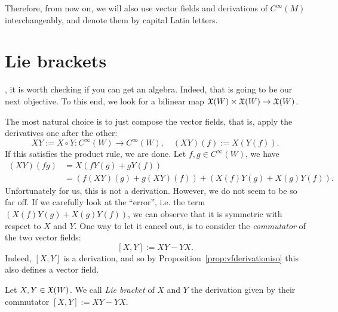 \begin{tcolorbox}
Therefore, from now on, we will also use vector fields and derivations of $C^\infty(M)$ interchangeably, and denote them by capital Latin letters.
\end{tcolorbox}

\section{Lie brackets}

, it is worth checking if you can get an algebra.
Indeed, that is going to be our next objective.
To this end, we look for a bilinear map $\mathfrak{X}(W)\times\mathfrak{X}(W) \to \mathfrak{X}(W)$.

The most natural choice is to just compose the vector fields, that is, apply the derivatives one after the other:
\begin{equation}
	X Y := X \circ Y : C^\infty(W) \to C^\infty(W), \quad
	(X Y)(f) := X(Y(f)).
\end{equation}
If this satisfies the product rule, we are done.
Let $f,g\in C^\infty(W)$, we have
\begin{align}
	(X Y)(fg) & = X(fY(g) + gY(f))                                                       \\
	          & = \left(f(X Y)(g) + g(X Y)(f)\right) + \left( X(f)Y(g) +X(g)Y(f)\right).
\end{align}
Unfortunately for us, this is not a derivation. However, we do not seem to be so far off.
If we carefully look at the ``error'', i.e. the term $\left( X(f)Y(g) +X(g)Y(f)\right)$, we can observe that it is symmetric with respect to $X$ and $Y$.
One way to let it cancel out, is to consider the \emph{commutator} of the two vector fields:
\begin{equation}\label{def:commutator}
	[X,Y] := X Y - Y X.
\end{equation}
Indeed, $[X,Y]$ is a derivation, and so by Proposition~\ref{prop:vfderivationiso} this also defines a vector field.

\begin{definition}
	Let $X,Y\in\mathfrak{X}(W)$. We call \emph{Lie bracket} of $X$ and $Y$ the derivation given by their commutator $[X,Y] := X Y - Y X$.
\end{definition}

